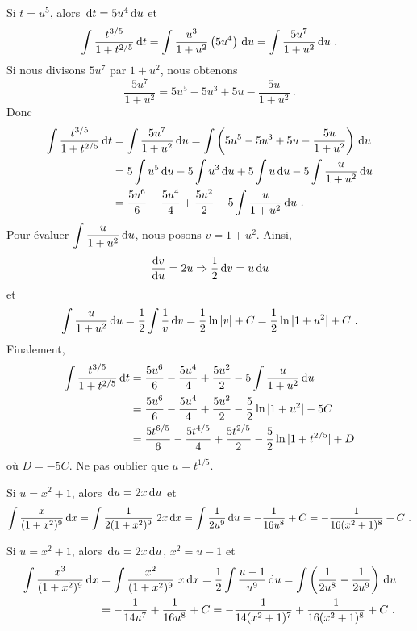 {
Si $\displaystyle t = u^5$, alors $\,\mathrm{d}t = 5u^4 \,\mathrm{d}u$ et 
\[
\int \frac{t^{3/5}}{1+t^{2/5}} \,\mathrm{d}t 
= \int \frac{u^3}{1+u^2} \left( 5 u^4\right) \,\mathrm{d}u
= \int \frac{5u^7}{1+u^2} \,\mathrm{d}u \ .
\]
Si nous divisons $5u^7$ par $1+u^2$, nous obtenons
\[
\frac{5u^7}{1+u^2} = 5u^5 - 5u^3 + 5u - \frac{5u}{1+u^2} \ .
\]
Donc
\begin{align*}
\int \frac{t^{3/5}}{1+t^{2/5}} \,\mathrm{d}t &= \int \frac{5u^7}{1+u^2} \,\mathrm{d}u
= \int \left( 5u^5 - 5u^3 + 5u - \frac{5u}{1+u^2} \right) \,\mathrm{d}u \\
&=  5 \int u^5 \,\mathrm{d}u - 5 \int u^3 \,\mathrm{d}u + 5 \int u \,\mathrm{d}u
- 5 \int \frac{u}{1+u^2} \,\mathrm{d}u \\
&= \frac{5u^6}{6} - \frac{5u^4}{4} + \frac{5u^2}{2} -
5 \int \frac{u}{1+u^2} \,\mathrm{d}u \ .
\end{align*}
Pour évaluer $\displaystyle \int \frac{u}{1+u^2} \,\mathrm{d}u$, nous posons
$v= 1+u^2$.  Ainsi,
\[
\frac{\mathrm{d}v}{\mathrm{d}u} = 2 u \Rightarrow \frac{1}{2} \,\mathrm{d}v = u \,\mathrm{d}u
\]
et
\[
\int \frac{u}{1+u^2} \,\mathrm{d}u = \frac{1}{2} \int \frac{1}{v} \,\mathrm{d}v
= \frac{1}{2} \ln|v| + C = \frac{1}{2} \ln|1+u^2| + C \ .
\]
Finalement,
\begin{align*}
\int \frac{t^{3/5}}{1+t^{2/5}} \,\mathrm{d}t &=
\frac{5u^6}{6} - \frac{5u^4}{4} + \frac{5u^2}{2} -
5 \int \frac{u}{1+u^2} \,\mathrm{d}u \\
&= \frac{5u^6}{6} - \frac{5u^4}{4} + \frac{5u^2}{2} - \frac{5}{2} \ln|1+u^2|
- 5C \\
&= \frac{5t^{6/5}}{6} - \frac{5t^{4/5}}{4} + \frac{5t^{2/5}}{2} -
\frac{5}{2} \ln|1+t^{2/5}| + D
\end{align*}
où $D = -5C$.  Ne pas oublier que $u = t^{1/5}$.

 Si $u=x^2+1$, alors $\,\mathrm{d}u = 2 x \,\mathrm{d}u$ et
\[
\int \frac{x}{(1+x^2)^9}\,\mathrm{d}x =
\int \frac{1}{2(1+x^2)^9}\ 2x\,\mathrm{d}x =
\int \frac{1}{2u^9} \,\mathrm{d}u = -\frac{1}{16 u^8} + C
= - \frac{1}{16 (x^2+1)^8} + C \ .
\]

 Si $u=x^2+1$, alors $\,\mathrm{d}u = 2 x \,\mathrm{d}u$,
$x^2 = u -1$ et
\begin{align*}
\int \frac{x^3}{(1+x^2)^9}\,\mathrm{d}x &=
\int \frac{x^2}{(1+x^2)^9}\ x\,\mathrm{d}x =
\frac{1}{2} \int \frac{u-1}{u^9}\,\mathrm{d}u =
\int \left( \frac{1}{2u^8} - \frac{1}{2u^9} \right)\,\mathrm{d}u \\
&= - \frac{1}{14 u^7} + \frac{1}{16 u^8} + C
= - \frac{1}{14 (x^2+1)^7} + \frac{1}{16 (x^2+1)^8} + C \ .
\end{align*}
}

